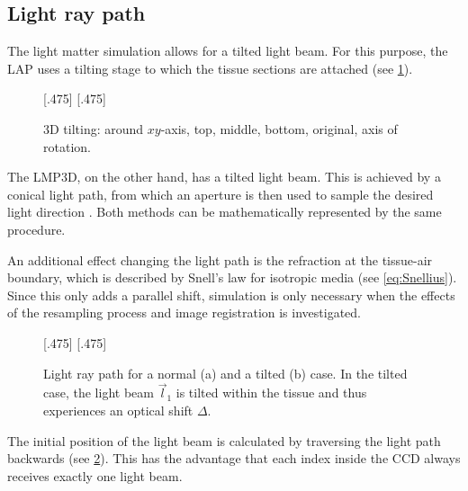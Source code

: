 \subsection{Light ray path}
\label{sec:pathOfLight}
%
The light matter simulation allows for a tilted light beam.
For this purpose, the \ac{LAP} uses a tilting stage to which the tissue sections are attached (see \cref{fig:tilting_camera_view}).
%
\begin{figure}[!t]
\setlength{\tikzheight}{0.42\textwidth}
[.475\textwidth]{}\hfill
{}
[.475\textwidth]{}
\tikzset{external/export=false}
\caption[]{3D tilting: around $xy$-axis, \raisebox{.25em}{\tikz \draw[red,thick](0,0)--(0.25,0);} top, \raisebox{.25em}{\tikz \draw[green,thick](0,0)--(0.25,0);} middle, \raisebox{.25em}{\tikz \draw[blue,thick](0,0)--(0.25,0);} bottom, \raisebox{.25em}{\tikz \draw[dash pattern=on 1.25pt off 1.25pt,thick](0,0)--(0.25,0);} original, \raisebox{.25em}{\tikz \draw[gray](0,0)--(0.25,0);} axis of rotation.}
\label{fig:tilting_camera_view}
\end{figure}
%
The \ac{LMP3D}, on the other hand, has a tilted light beam.
This is achieved by a conical light path, from which an aperture is then used to sample the desired light direction \cite{Wiese:887678}.
Both methods can be mathematically represented by the same procedure.
\par
%
An additional effect changing the light path is the refraction at the tissue-air boundary, which is described by Snell's law for isotropic media (see \cref{eq:Snellius}).
Since this only adds a parallel shift, simulation is only necessary when the effects of the resampling process and image registration is investigated.
\par
%
\begin{figure}[!t]
\setlength{\tikzwidth}{0.45\textwidth}
[.475\textwidth]{
\def\tilt{0}
\def\nindex{2.25}
}\hfill
{}[.475\textwidth]{
}
\caption[]{Light ray path for a normal (a) and a tilted (b) case. In the tilted case, the light beam $\vec{l}_1$ is tilted within the tissue and thus experiences an optical shift $\Delta$.}
\label{fig:tilted_side_view}
\end{figure}
%
The initial position of the light beam is calculated by traversing the light path backwards (see \cref{fig:tilted_side_view}).
This has the advantage that each index inside the \ac{CCD} always receives exactly one light beam.
